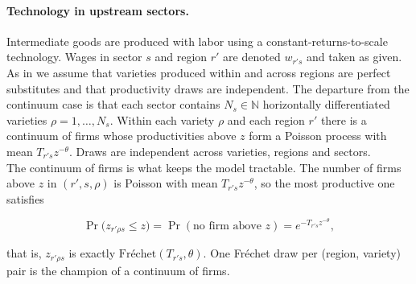 \paragraph{Technology in upstream sectors.} Intermediate goods are produced with labor using a constant-returns-to-scale technology. Wages in sector $s$ and region $r'$ are denoted $w_{r's}$ and taken as given. As in \cite{EatonKortum2002} we assume that varieties produced within and across regions are perfect substitutes and that productivity draws are independent. The departure from the continuum case is that each sector contains $N_{s}\in\mathbb{N}$ horizontally differentiated varieties $\rho=1,\dots,N_{s}$. Within each variety $\rho$ and each region $r'$ there is a continuum of firms whose productivities above $z$ form a Poisson process with mean $T_{r's}z^{-\theta}$. Draws are independent across varieties, regions and sectors.\\

The continuum of firms is what keeps the model tractable. The number of firms above $z$ in $(r',s,\rho)$ is Poisson with mean $T_{r's}z^{-\theta}$, so the most productive one satisfies 

\begin{equation}
\Pr\big(z_{r'\rho s}\le z\big)=\Pr(\text{no firm above }z)=e^{-T_{r's}z^{-\theta}},
\label{eq:app-champion}
\end{equation}

that is, $z_{r'\rho s}$ is exactly $\mathrm{Fréchet}(T_{r's},\theta)$. One Fréchet draw per (region, variety) pair is the champion of a continuum of firms. \\

